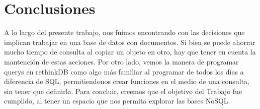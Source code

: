 \section{Conclusiones}

A lo largo del presente trabajo, nos fuimos encontrando con las decisiones que implican trabajar en una base de datos con documentos. Si bien se puede ahorrar mucho tiempo de consulta al copiar un objeto en otro, hay que tener en cuenta la mantención de estas acciones. Por otro lado, vemos la manera de programar querys en rethinkDB como algo más familiar al programar de todos los días a diferencia de SQL, permitiendonos crear funciones en el medio de una consulta, sin tener que definirla. Para concluir, creemos que el objetivo del Trabajo fue cumplido, al tener un espacio que nos permita explorar las bases NoSQL.   